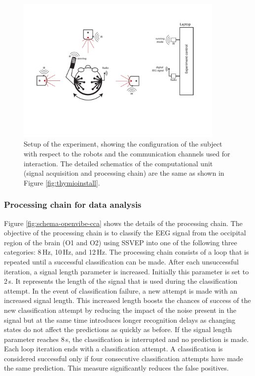 \documentclass[smallextended]{svjour3}
\begin{document}
\begin{figure}
\center
\includegraphics[width=0.9\textwidth]{figures/schema-global2.pdf}
    \caption{Setup of the experiment, showing the configuration of the subject with respect to the robots and the communication channels used for interaction. The detailed schematics of the computational unit (signal acquisition and processing chain) are the same as shown in Figure \ref{fig:thymioinstall}.} \label{fig:experiment-set-up}
\end{figure}

\subsubsection{Processing chain for data analysis}
Figure \ref{fig:schema-openvibe-cca} shows the details of the processing chain.
The objective of the processing chain is to classify the EEG signal from the occipital region of the brain (O1 and O2) using SSVEP into one of the following three categories: 8\,Hz, 10\,Hz, and 12\,Hz.
The processing chain consists of a loop that is repeated until a successful classification can be made.
After each unsuccessful iteration, a signal length parameter is increased. Initially this parameter is set to 2\,s.
It represents the length of the signal that is used during the classification attempt.
In the event of classification failure, a new attempt is made with an increased signal length.
This increased length boosts the chances of success of the new classification attempt by reducing the impact of the noise present in the signal
but at the same time introduces longer recognition delays as changing states do not affect the predictions as quickly as before.
If the signal length parameter reaches 8\,s, the classification is interrupted and no prediction is made.
Each loop iteration ends with a classification attempt.
A classification is considered successful only if four consecutive classification attempts have made the same prediction. This measure significantly reduces the false positives.
\end{document}
